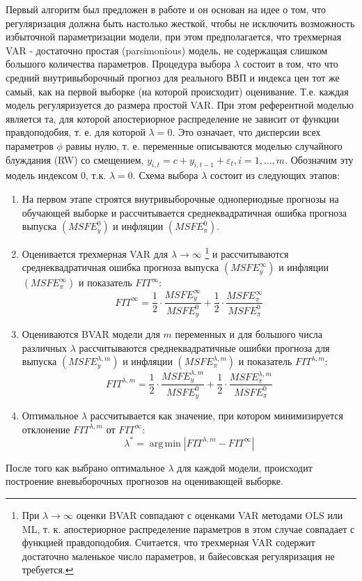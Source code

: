 \documentclass[11pt]{article} %
\DeclareMathOperator*{\argmin}{arg\,min}
\begin{document}
Первый алгоритм был предложен в работе \cite{banbura_al_2010_large} и он основан на идее о том, что регуляризация должна быть настолько жесткой, чтобы не исключить возможность избыточной параметризации модели, при этом предполагается, что трехмерная VAR - достаточно простая (parsimonious) модель, не содержащая слишком большого количества параметров. Процедура выбора $\lambda$ состоит в том, что что средний внутривыборочный прогноз для реального ВВП и индекса цен тот же самый, как на первой выборке (на которой происходит) оценивание. Т.е. каждая модель регуляризуется до размера простой VAR. При этом  референтной моделью является та, для которой апостериорное распределение не зависит от функции правдоподобия, т. е. для которой $\lambda=0$. Это означает, что дисперсии всех параметров $\phi$ равны нулю, т. е. переменные описываются моделью случайного блуждания (RW) со смещением, $y_{i,t}=c+y_{i,t-1} +\varepsilon_t, i=1,\ldots,m$. Обозначим эту модель индексом 0,  т.к. $\lambda=0$.
Схема выбора $\lambda$ состоит из следующих этапов:
\begin{enumerate}
\item На первом этапе  строятся внутривыборочные однопериодные прогнозы на обучающей выборке и рассчитывается среднеквадратичная ошибка прогноза выпуска $(MSFE_y^{0})$ и инфляции $(MSFE_{\pi}^{0})$.
\item Оценивается трехмерная VAR для $\lambda\to \infty$ \footnote{При $\lambda\to \infty$ оценки BVAR совпадают с оценками VAR методами OLS или ML, т. к. апостериорное распределение параметров в этом случае совпадает с функцией правдоподобия. Считается, что трехмерная VAR содержит достаточно маленькое число параметров, и байесовская регуляризация не требуется.} и рассчитываются среднеквадратичная ошибка прогноза выпуска $(MSFE_y^{\infty})$ и инфляции $(MSFE_{\pi}^{\infty})$ и показатель $FIT^{\infty}$:
\begin{equation}
FIT^{\infty}=\frac{1}{2}\cdot\frac{MSFE_y^{\infty}}{MSFE^0_y} + \frac{1}{2}\cdot\frac{MSFE_{\pi}^{\infty}}{MSFE^0_{\pi}}
\end{equation}
\item Оцениваются BVAR модели для $m$ переменных и для большого числа различных $\lambda$ рассчитываются среднеквадратичные ошибки прогноза для выпуска $(MSFE_y^{\lambda,m})$ и инфляции $(MSFE_{\pi}^{\lambda,m})$ и показатель $FIT^{{\lambda,m}}$: 
\begin{equation}
FIT^{\lambda,m}=\frac{1}{2}\cdot\frac{MSFE_y^{\lambda,m}}{MSFE^0_y} + \frac{1}{2}\cdot\frac{MSFE_{\pi}^{\lambda,m}}{MSFE^0_{\pi}}
\end{equation}
\item Оптимальное $\lambda$ рассчитывается как значение, при котором минимизируется отклонение $FIT^{\lambda,m}$ от $FIT^{\infty}$:
\begin{equation}
\lambda^*=\argmin |FIT^{\lambda, m}-FIT^{\infty}| 
\end{equation}
\end{enumerate}
После того как выбрано оптимальное $\lambda$ для каждой модели, происходит построение вневыборочных прогнозов на оценивающей выборке.
\end{document}
